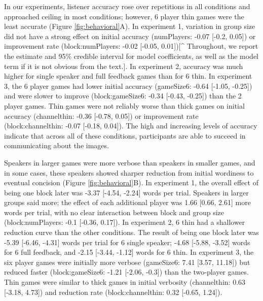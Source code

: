 \documentclass[
  english,
  a4paper,
]{article}
\begin{document}
In our experiments, listener accuracy rose over repetitions in all conditions and approached ceiling in most conditions; however, 6 player thin games were the least accurate (Figure \ref{fig:behavioral}A). In experiment 1, variation in group size did not have a strong effect on initial accuracy (numPlayers: -0.07 {[}-0.2, 0.05{]}) or improvement rate (block:numPlayers: -0.02 {[}-0.05, 0.01{]}){[}\^{} Throughout, we report the estimate and 95\% credible interval for model coefficients, as well as the model term if it is not obvious from the text.{]}. In experiment 2, accuracy was much higher for single speaker and full feedback games than for 6 thin. In experiment 3, the 6 player games had lower initial accuracy (gameSize6: -0.64 {[}-1.05, -0.25{]}) and were slower to improve (block:gameSize6: -0.34 {[}-0.43, -0.25{]}) than the 2 player games. Thin games were not reliably worse than thick games on initial accuracy (channelthin: -0.36 {[}-0.78, 0.05{]}) or improvement rate (block:channelthin: -0.07 {[}-0.18, 0.04{]}). The high and increasing levels of accuracy indicate that across all of these conditions, participants are able to succeed in communicating about the images.

Speakers in larger games were more verbose than speakers in smaller games, and in some cases, these speakers showed sharper reduction from initial wordiness to eventual concision (Figure \ref{fig:behavioral}B). In experiment 1, the overall effect of being one block later was -3.37 {[}-4.54, -2.24{]} words per trial. Speakers in larger groups said more; the effect of each additional player was 1.66 {[}0.66, 2.61{]} more words per trial, with no clear interaction between block and group size (block:numPlayers: -0.1 {[}-0.36, 0.17{]}). In experiment 2, 6 thin had a shallower reduction curve than the other conditions. The result of being one block later was -5.39 {[}-6.46, -4.31{]} words per trial for 6 single speaker; -4.68 {[}-5.88, -3.52{]} words for 6 full feedback, and -2.15 {[}-3.44, -1.12{]} words for 6 thin. In experiment 3, the six player games were initially more verbose (gameSize6: 7.41 {[}3.57, 11.18{]}) but reduced faster (block:gameSize6: -1.21 {[}-2.06, -0.3{]}) than the two-player games. Thin games were similar to thick games in initial verbosity (channelthin: 0.63 {[}-3.18, 4.73{]}) and reduction rate (block:channelthin: 0.32 {[}-0.65, 1.24{]}).
\end{document}
